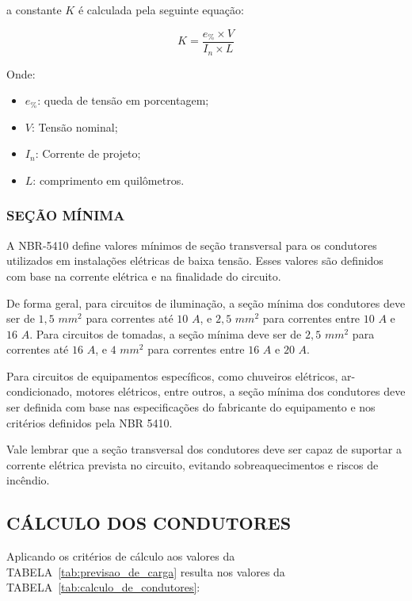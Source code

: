 a constante $K$ é calculada pela seguinte equação:

\begin{equation}
	K = \frac{e_{\%} \times V}{I_n \times L}
\end{equation}

Onde:

\begin{itemize}
	\item $e_{\%}$: queda de tensão em porcentagem;
	\item $V$: Tensão nominal;
	\item $I_n$: Corrente de projeto;
	\item $L$: comprimento em quilômetros.
\end{itemize}

\subsubsection{SEÇÃO MÍNIMA}

A NBR-5410 define valores mínimos de seção transversal para os condutores utilizados em instalações elétricas de baixa tensão. Esses valores são definidos com base na corrente elétrica e na finalidade do circuito.

De forma geral, para circuitos de iluminação, a seção mínima dos condutores deve ser de $1,5$ $mm^2$ para correntes até $10$ $A$, e $2,5$ $mm^2$ para correntes entre $10$ $A$ e $16$ $A$. Para circuitos de tomadas, a seção mínima deve ser de $2,5$ $mm^2$ para correntes até $16$ $A$, e $4$ $mm^2$ para correntes entre $16$ $A$ e $20$ $A$.

Para circuitos de equipamentos específicos, como chuveiros elétricos, ar-condicionado, motores elétricos, entre outros, a seção mínima dos condutores deve ser definida com base nas especificações do fabricante do equipamento e nos critérios definidos pela NBR 5410.

Vale lembrar que a seção transversal dos condutores deve ser capaz de suportar a corrente elétrica prevista no circuito, evitando sobreaquecimentos e riscos de incêndio.
\pagebreak
\subsection{CÁLCULO DOS CONDUTORES}

Aplicando os critérios de cálculo aos valores da TABELA~\ref{tab:previsao_de_carga} resulta nos valores da TABELA~\ref{tab:calculo_de_condutores}:

